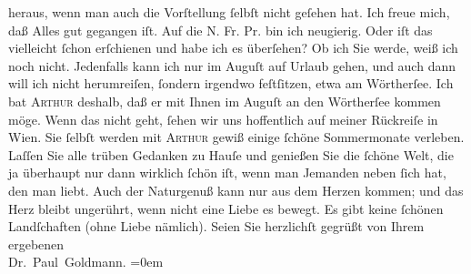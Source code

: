 \begin{ledgroupsized}[t]{13cm}
               heraus, wenn man auch die Vorſtellung ſelbſt nicht geſehen hat. Ich freue mich, daß Alles gut gegangen
               iſt. Auf die N. Fr. Pr. bin ich neugierig. Oder
               iſt das \label{K_L03527-3v}\label{K_L03527-3h} vielleicht ſchon erſchienen und habe ich
               es überſehen?\pend
           \pstart
           Ob ich Sie \label{K_L03527-4v}\label{K_L03527-4h} werde, weiß ich noch nicht. Jedenfalls kann ich nur im Auguſt auf Urlaub gehen, {\pb}und auch dann
               will ich nicht herumreiſen, ſondern irgendwo feſtſitzen, etwa am Wörtherſee. Ich bat \textsc{Arthur}{ } deshalb, daß er mit Ihnen im Auguſt an den Wörtherſee
               kommen möge. Wenn das nicht geht, ſehen wir uns hoffentlich auf meiner Rückreiſe in
                  Wien.\pend
           \pstart
           Sie ſelbſt werden mit \textsc{Arthur} gewiß einige ſchöne {\pb}Sommermonate verleben.
               Laſſen Sie alle trüben Gedanken zu Hauſe und genießen Sie die ſchöne Welt, die ja
               überhaupt nur dann wirklich ſchön iſt, wenn man Jemanden neben ſich hat, den man \strikeout{\textcolor{gray}{l}} liebt. Auch der Naturgenuß kann nur aus dem Herzen kommen; und das Herz bleibt
               ungerührt, wenn nicht eine Liebe es bewegt. Es gibt keine ſchönen Landſchaften (ohne
               Liebe nämlich).\pend
           \pstart
           Seien Sie herzlichſt gegrüßt von Ihrem ergebenen {\\[\baselineskip]}\spacefill\mbox{Dr. Paul Goldmann.}\pend
           \leftskip=0em{}
         
         \endnumbering{}\end{ledgroupsized}\begin{anhang}\end{anhang}\newcommand{\dateiname}{L03527}\newcommand{\titel}{Paul Goldmann an Olga Gussmann, 10. 5. [1901]}\newcommand{\editorInnen}{Martin Anton Müller und Laura Untner}
      